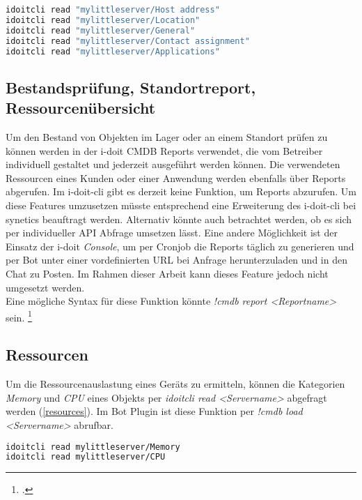 \begin{lstlisting}[language=bash, label=show, caption=Detailansicht eines Objekts mit i-doit-cli]
idoitcli read "mylittleserver/Host address"
idoitcli read "mylittleserver/Location"
idoitcli read "mylittleserver/General"
idoitcli read "mylittleserver/Contact assignment"
idoitcli read "mylittleserver/Applications"
\end{lstlisting}

\subsection{Bestandsprüfung, Standortreport, Ressourcenübersicht}
Um den Bestand von Objekten im Lager oder an einem Standort prüfen zu können werden in der i-doit \acs{CMDB} Reports verwendet, die vom Betreiber individuell gestaltet und jederzeit ausgeführt werden können. Die verwendeten Ressourcen eines Kunden oder einer Anwendung werden ebenfalls über Reports abgerufen.  Im i-doit-cli gibt es derzeit keine Funktion, um Reports abzurufen. Um diese Features umzusetzen müsste entsprechend eine Erweiterung des i-doit-cli bei synetics beauftragt werden. Alternativ könnte auch betrachtet werden, ob es sich per individueller API Abfrage umsetzen lässt. Eine andere Möglichkeit ist der Einsatz der i-doit \textit{Console}, um per Cronjob die Reports täglich zu generieren und per Bot unter einer vordefinierten URL bei Anfrage herunterzuladen und in den Chat zu Posten. Im Rahmen dieser Arbeit kann dieses Feature jedoch nicht umgesetzt werden.\\
Eine mögliche Syntax für diese Funktion könnte \textit{!cmdb report <Reportname>} sein. 
\footcites[Vgl.][o. \pno]{idoit_2019_report}[Vgl.][o. \pno]{idoit_2019_console}

\subsection{Ressourcen}
Um die Ressourcenauslastung eines Geräts zu ermitteln, können die Kategorien \textit{Memory} und \textit{CPU} eines Objekts per \textit{idoitcli read <Servername>} abgefragt werden (\autoref{resources}). Im Bot Plugin ist diese Funktion per \textit{!cmdb load <Servername>} abrufbar. 

\begin{lstlisting}[language=bash, label=resources, caption=Ressourcenauslastung eines Geräts]
idoitcli read mylittleserver/Memory
idoitcli read mylittleserver/CPU
\end{lstlisting}

